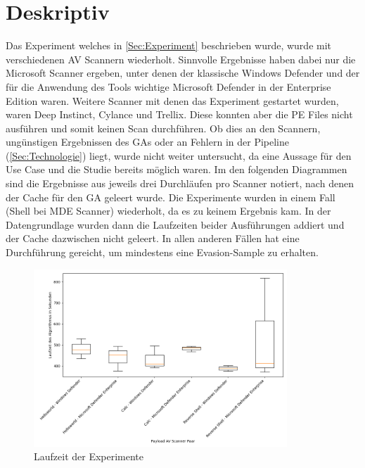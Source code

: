 \section{Deskriptiv}
Das Experiment welches in \ref{Sec:Experiment} beschrieben wurde, wurde mit verschiedenen AV Scannern wiederholt. Sinnvolle Ergebnisse haben dabei nur die Microsoft Scanner ergeben, unter denen der klassische Windows Defender und der für die Anwendung des Tools wichtige Microsoft Defender in der Enterprise Edition waren. Weitere Scanner mit denen das Experiment gestartet wurden, waren Deep Instinct, Cylance und Trellix. Diese konnten aber die PE Files nicht ausführen und somit keinen Scan durchführen. Ob dies an den Scannern, ungünstigen Ergebnissen des GAs oder an Fehlern in der Pipeline (\ref{Sec:Technologie}) liegt, wurde nicht weiter untersucht, da eine Aussage für den Use Case und die Studie bereits möglich waren.
Im den folgenden Diagrammen sind die Ergebnisse aus jeweils drei Durchläufen pro Scanner notiert, nach denen der Cache für den GA geleert wurde. Die Experimente wurden in einem Fall (Shell bei MDE Scanner) wiederholt, da es zu keinem Ergebnis kam. In der Datengrundlage wurden dann die Laufzeiten beider Ausführungen addiert und der Cache dazwischen nicht geleert. In allen anderen Fällen hat eine Durchführung gereicht, um mindestens eine Evasion-Sample zu erhalten.


\begin{figure}[h]
    \centering
    \includegraphics[width=0.85\textwidth]{gfx/Desktriptiv/time_overview.png}
    \caption{Laufzeit der Experimente}
    \label{fig:runtime_overview}
\end{figure}

